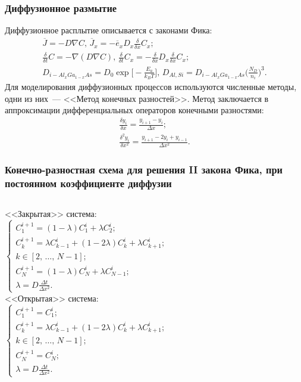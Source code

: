 \documentclass[10pt,pdf,hyperref={unicode},aspectratio={169}]{beamer}
\begin{document}
\begin{frame}
	\frametitle{Диффузионное размытие}
	Диффузионное расплытие описывается с законами Фика:
	\begin{gather*}
		\overline{J} = - D \nabla C,\,
		\overline{J}_{x} = - \overline{e}_{x}D_{x} \frac{\delta}{\delta x} C_{x};\\
		\frac{\delta}{\delta t}C = - \nabla (D \nabla C),\,
		\frac{\delta}{\delta t}C_{x} = - \frac{\delta}{\delta x} D_{x} \frac{\delta}{\delta x} C_{x};\\
		D_{i-Al_{x}Ga_{1-x}As} = D_{0}\exp\bigg[-\frac{E_{a}}{k_{B}T}\bigg],\, D_{Al,Si} = D_{i-Al_{x}Ga_{1-x}As}\Big( \frac{N_{D}}{n_{i}} \Big)^{3}.
	\end{gather*}
	Для моделирования диффузионных процессов используются численные методы, одни из них~--- <<Метод конечных разностей>>. Метод заключается в аппроксимации дифференциальных операторов конечными разностями:
	\begin{gather*}
		\frac{\delta y_{i} }{\delta x } = \frac{y_{i+1} - y_{i}}{\Delta x};\\
		\frac{\delta^{2} y_{i} }{\delta x^{2} } = \frac{y_{i+1} - 2y_{i} + y_{i-1}}{\Delta x^2}.
	\end{gather*}
\end{frame}

\begin{frame}
	\frametitle{Конечно-разностная схема для решения II закона Фика, при постоянном коэффициенте диффузии}
	\begin{columns}
		<<Закрытая>> система:
		\begin{equation*}
			\begin{cases}
				C^{i+1}_{1} = (1 - \lambda)C^{i}_{1} + \lambda C^{i}_{2};\\
				C^{i+1}_{k} = \lambda C^{i}_{k-1} + (1 - 2\lambda)C^{i}_{k} + \lambda C^{i}_{k+1};\\
				k \in [2,\,\dots,\,N-1];\\
				C^{i+1}_{N} = (1 - \lambda)C^{i}_{N} + \lambda C^{i}_{N-1};\\
				\lambda = D\frac{\Delta t}{\Delta x^{2}}.
			\end{cases}
		\end{equation*}
		<<Открытая>> система:
		\begin{equation*}
			\begin{cases}
				C^{i+1}_{1} = C^{i}_{1};\\
				C^{i+1}_{k} = \lambda C^{i}_{k-1} + (1 - 2\lambda)C^{i}_{k} + \lambda C^{i}_{k+1};\\
				k \in [2,\,\dots,\,N-1];\\
				C^{i+1}_{N} = C^{i}_{N};\\
				\lambda = D\frac{\Delta t}{\Delta x^{2}}.
			\end{cases}
		\end{equation*}
	\end{columns}
\end{frame}
\end{document}

